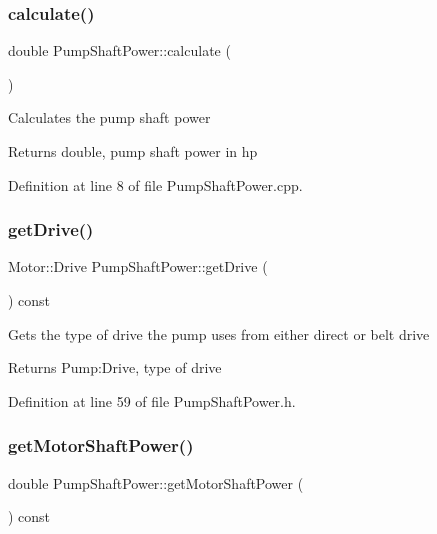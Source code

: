 \subsubsection{\texorpdfstring{calculate()}{calculate()}}
{\footnotesize\ttfamily double Pump\+Shaft\+Power\+::calculate (\begin{DoxyParamCaption}{ }\end{DoxyParamCaption})}

Calculates the pump shaft power \begin{DoxyReturn}{Returns}
double, pump shaft power in hp 
\end{DoxyReturn}


Definition at line 8 of file Pump\+Shaft\+Power.\+cpp.

\mbox{\label{class_pump_shaft_power_a382653196fd65562cd3823049ab7573a}} 
\subsubsection{\texorpdfstring{get\+Drive()}{getDrive()}}
{\footnotesize\ttfamily Motor\+::\+Drive Pump\+Shaft\+Power\+::get\+Drive (\begin{DoxyParamCaption}{ }\end{DoxyParamCaption}) const\hspace{0.3cm}{\ttfamily [inline]}}

Gets the type of drive the pump uses from either direct or belt drive \begin{DoxyReturn}{Returns}
Pump\+:Drive, type of drive 
\end{DoxyReturn}


Definition at line 59 of file Pump\+Shaft\+Power.\+h.

\mbox{\label{class_pump_shaft_power_acb91eadb960f946ffee5373d4839a5be}} 
\subsubsection{\texorpdfstring{get\+Motor\+Shaft\+Power()}{getMotorShaftPower()}}
{\footnotesize\ttfamily double Pump\+Shaft\+Power\+::get\+Motor\+Shaft\+Power (\begin{DoxyParamCaption}{ }\end{DoxyParamCaption}) const\hspace{0.3cm}{\ttfamily [inline]}}

